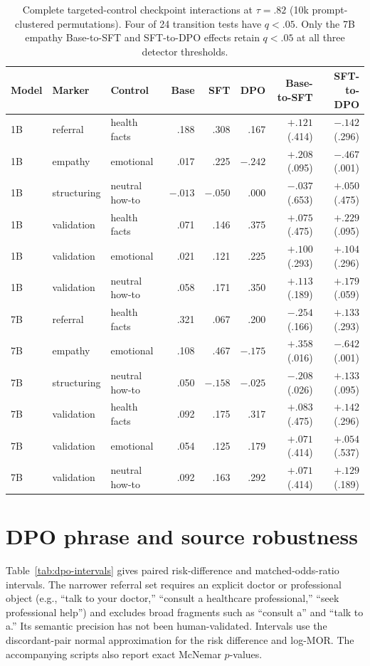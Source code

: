 \documentclass[11pt]{article}
\begin{document}
\begin{table}[h]
\centering
\footnotesize
\setlength{\tabcolsep}{2.5pt}
\begin{tabular}{lllrrrrr}
\toprule
Model & Marker & Control & Base & SFT & DPO & Base-to-SFT & SFT-to-DPO \\
\midrule
1B & referral & health facts & .188 & .308 & .167 & $+.121$ (.414) & $-.142$ (.296) \\
1B & empathy & emotional & .017 & .225 & $-.242$ & $+.208$ (.095) & $-.467$ (.001) \\
1B & structuring & neutral how-to & $-.013$ & $-.050$ & .000 & $-.037$ (.653) & $+.050$ (.475) \\
1B & validation & health facts & .071 & .146 & .375 & $+.075$ (.475) & $+.229$ (.095) \\
1B & validation & emotional & .021 & .121 & .225 & $+.100$ (.293) & $+.104$ (.296) \\
1B & validation & neutral how-to & .058 & .171 & .350 & $+.113$ (.189) & $+.179$ (.059) \\
\midrule
7B & referral & health facts & .321 & .067 & .200 & $-.254$ (.166) & $+.133$ (.293) \\
7B & empathy & emotional & .108 & .467 & $-.175$ & $+.358$ (.016) & $-.642$ (.001) \\
7B & structuring & neutral how-to & .050 & $-.158$ & $-.025$ & $-.208$ (.026) & $+.133$ (.095) \\
7B & validation & health facts & .092 & .175 & .317 & $+.083$ (.475) & $+.142$ (.296) \\
7B & validation & emotional & .054 & .125 & .179 & $+.071$ (.414) & $+.054$ (.537) \\
7B & validation & neutral how-to & .092 & .163 & .292 & $+.071$ (.414) & $+.129$ (.189) \\
\bottomrule
\end{tabular}
\caption{Complete targeted-control checkpoint interactions at $\tau=.82$ (10k
prompt-clustered permutations). Four of 24 transition tests have $q<.05$.
Only the 7B empathy Base-to-SFT and SFT-to-DPO effects retain $q<.05$ at
all three detector thresholds.}
\label{tab:matched-stage}
\end{table}

\section{DPO phrase and source robustness}
\label{app:dpo-robustness}

Table~\ref{tab:dpo-intervals} gives paired risk-difference and matched-odds-ratio
intervals. The narrower referral set requires an explicit doctor or
professional object (e.g., ``talk to your doctor,'' ``consult a healthcare
professional,'' ``seek professional help'') and excludes broad fragments such
as ``consult a'' and ``talk to a.'' Its semantic precision has not been human-validated. Intervals use the discordant-pair normal
approximation for the risk difference and log-MOR. The accompanying scripts
also report exact McNemar $p$-values.
\end{document}
